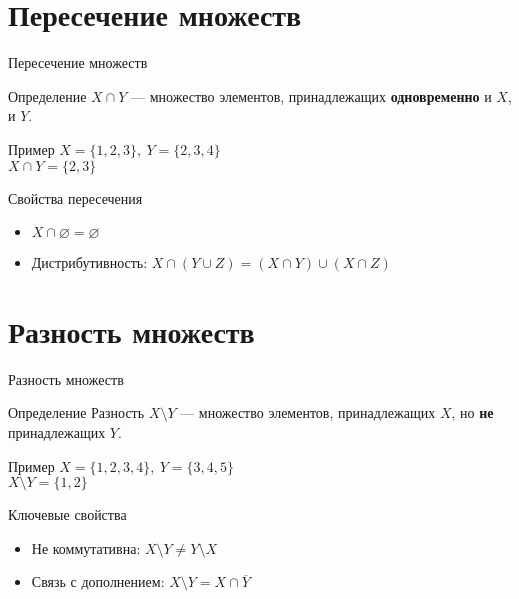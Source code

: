 \documentclass{beamer}
\begin{document}
\section{Пересечение множеств}
\begin{frame}{Пересечение множеств}
    \begin{block}{Определение}
        $X \cap Y$ — множество элементов, принадлежащих \textbf{одновременно} и $X$, и $Y$.
    \end{block}
    \begin{exampleblock}{Пример}
        $X = \{1,2,3\},\ Y = \{2,3,4\}$ \\
        $X \cap Y = \{2,3\}$
    \end{exampleblock}
    \begin{block}{Свойства пересечения}
        \begin{itemize}
        \item $X \cap \varnothing = \varnothing$
        \item Дистрибутивность: $X \cap (Y \cup Z) = (X \cap Y) \cup (X \cap Z)$
        \end{itemize}
    \end{block}
\end{frame}

\section{Разность множеств}
\begin{frame}{Разность множеств}
    \begin{block}{Определение}
        Разность $X \setminus Y$ — множество элементов, принадлежащих $X$, но \textbf{не} принадлежащих $Y$.
    \end{block}
    \begin{exampleblock}{Пример}
        $X = \{1,2,3,4\},\ Y = \{3,4,5\}$ \\
        $X \setminus Y = \{1,2\}$
    \end{exampleblock}
    \begin{block}{Ключевые свойства}
        \begin{itemize}
        \item Не коммутативна: $X \setminus Y \neq Y \setminus X$
        \item Связь с дополнением: $X \setminus Y = X \cap \overline{Y}$
        \end{itemize}
    \end{block}
\end{frame}
\end{document}
